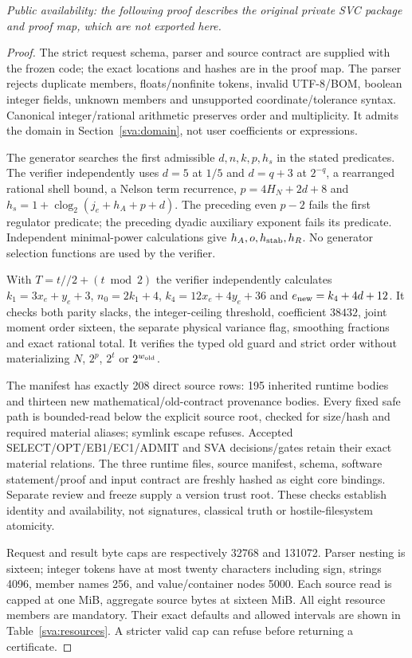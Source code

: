 \documentclass[11pt]{article}
\theoremstyle{plain}
\theoremstyle{definition}
\theoremstyle{remark}
\begin{document}
\noindent\emph{Public availability: the following proof describes the original
private SVC package and proof map, which are not exported here.}

\begin{proof}
The strict request schema, parser and source contract are supplied with
the frozen code; the exact locations and hashes are in the proof map.
The parser rejects duplicate members, floats/nonfinite tokens, invalid
UTF-8/BOM, boolean integer fields, unknown members and unsupported
coordinate/tolerance syntax. Canonical integer/rational arithmetic
preserves order and multiplicity. It admits the domain in
Section~\ref{sva:domain}, not user coefficients or expressions.

The generator searches the first admissible $d,n,k,p,h_s$ in the stated
predicates. The verifier independently uses $d=5$ at $1/5$ and $d=q+3$
at $2^{-q}$, a rearranged rational shell bound, a Nelson term recurrence,
$p=4H_N+2d+8$ and $h_s=1+\operatorname{clog}_2(j_e+h_A+p+d)$.
The preceding even $p-2$ fails the first regulator predicate; the
preceding dyadic auxiliary exponent fails its predicate. Independent
minimal-power calculations give $h_A,o,h_{\rm stab},h_R$.
No generator selection functions are used by the verifier.

With $T=t\mathbin{//}2+(t\bmod2)$ the verifier independently calculates
$k_1=3x_e+y_e+3$, $n_0=2k_1+4$, $k_4=12x_e+4y_e+36$ and
$e_{\rm new}=k_4+4d+12$. It checks both parity slacks, the integer-ceiling
threshold, coefficient $38432$, joint moment order sixteen, the separate
physical variance flag, smoothing fractions and exact rational total.
It verifies the typed old guard and strict order without materializing
$N$, $2^p$, $2^t$ or $2^{w_{\rm old}}$.

The manifest has exactly 208 direct source rows: 195 inherited runtime
bodies and thirteen new mathematical/old-contract provenance bodies.
Every fixed safe path is bounded-read below the explicit source root,
checked for size/hash and required material aliases; symlink escape
refuses. Accepted SELECT/OPT/EB1/EC1/ADMIT and SVA decisions/gates retain
their exact material relations. The three runtime files, source manifest,
schema, software statement/proof and input contract are freshly hashed
as eight core bindings. Separate review and freeze supply a
version trust root. These checks establish identity and availability,
not signatures, classical truth or hostile-filesystem atomicity.

Request and result byte caps are respectively 32768 and 131072. Parser
nesting is sixteen; integer tokens have at most twenty characters
including sign, strings 4096, member names 256, and value/container nodes
5000. Each source read is capped at one MiB, aggregate source bytes at
sixteen MiB. All eight resource members are mandatory. Their exact
defaults and allowed intervals are shown in Table~\ref{sva:resources}.
A stricter valid cap can refuse before returning a certificate.


\end{proof}
\end{document}
